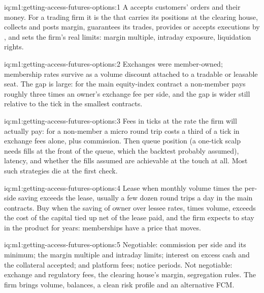 \begin{solution}{iq:m1:getting-access-futures-options:1}
A  accepts customers' orders and their money. For
a trading firm it is the  that carries its positions at the
clearing house, collects and posts margin, guarantees its trades, provides
or accepts executions by , and sets the firm's real limits: margin
multiple, intraday exposure, liquidation rights.
\end{solution}

\begin{solution}{iq:m1:getting-access-futures-options:2}
Exchanges were member-owned; membership rates survive as a volume discount
attached to a tradable or leasable seat. The gap is large: for the main
equity-index contract a non-member pays roughly three times an owner's
exchange fee per side, and the gap is wider still relative to the tick in
the smallest contracts.
\end{solution}

\begin{solution}{iq:m1:getting-access-futures-options:3}
Fees in ticks at the rate the firm will actually pay: for a non-member a
micro round trip costs a third of a tick in exchange fees alone, plus
commission. Then queue position (a one-tick scalp needs fills at the front of
the queue, which the backtest probably assumed), latency, and whether the
fills assumed are achievable at the touch at all. Most such strategies die at
the first check.
\end{solution}

\begin{solution}{iq:m1:getting-access-futures-options:4}
Lease when monthly volume times the per-side saving exceeds the lease,
usually a few dozen round trips a day in the main contracts. Buy when the
saving of owner over lessee rates, times volume, exceeds the cost of the
capital tied up net of the lease paid, and the firm expects to stay in the
product for years: memberships have a price that moves.
\end{solution}

\begin{solution}{iq:m1:getting-access-futures-options:5}
Negotiable: commission per side and its minimum; the margin multiple and
intraday limits; interest on excess cash and the collateral accepted;
 and platform fees; notice periods. Not negotiable: exchange and
regulatory fees, the clearing house's margin, segregation rules. The firm
brings volume, balances, a clean risk profile and an alternative FCM.
\end{solution}

